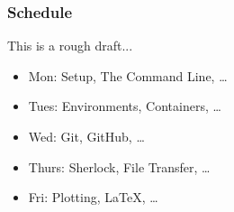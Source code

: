 \documentclass[aspectratio=169]{beamer}
\begin{document}
\begin{frame}
	\frametitle{Schedule}
	This is a rough draft...
	\begin{itemize}
		\item Mon: Setup, The Command Line, \dots
		\item Tues: Environments, Containers, \dots
		\item Wed: Git, GitHub, \dots
		\item Thurs: Sherlock, File Transfer, \dots
		\item Fri: Plotting, LaTeX, \dots
	\end{itemize}
\end{frame}
\end{document}
